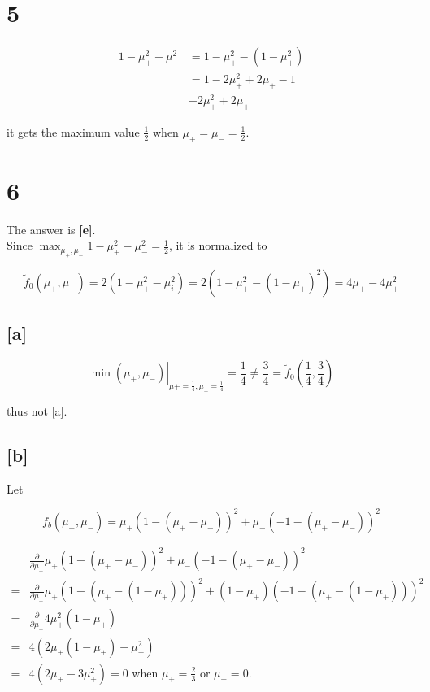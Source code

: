 \documentclass[fleqn,a4paper,12pt]{article}
\begin{document}
\section*{5}

\begin{align*}
  1 - \mu_+^2 - \mu_-^2
  &= 1 - \mu_+^2 - (1 - \mu_+^2) \\
  &= 1 - 2 \mu_+^2 + 2 \mu_+  - 1 \\
  & -2 \mu_+^2 + 2 \mu_+
\end{align*}

it gets the maximum value $\frac{1}{2}$ when $\mu_+ = \mu_- = \frac{1}{2}$.

\section*{6}

The answer is \textbf{[e]}.\\

Since $\max_{\mu_+, \mu_-} 1 - \mu_+^2 - \mu_-^2 = \frac{1}{2}$, it is normalized to

\begin{equation*}
  \tilde{f}_0(\mu_+, \mu_-) = 2(1 - \mu_+^2 - \mu_i^2) = 2(1 - \mu_+^2 - (1 - \mu_+)^2) = 4 \mu_+ - 4 \mu_+^2 
\end{equation*}

\subsection*{[a]}

\begin{equation*}
  \left. \min(\mu_+, \mu_-) \right|_{\mu+=\frac{1}{4}, \mu_-=\frac{1}{4}} = \frac{1}{4} \ne \frac{3}{4} = \tilde{f}_0(\frac{1}{4}, \frac{3}{4})
\end{equation*}

thus not [a].

\subsection*{[b]}

Let

\begin{equation*}
  f_b(\mu_+, \mu_-) = \mu_+(1 - (\mu_+ - \mu_-))^2 + \mu_-(-1 - (\mu_+ - \mu_-))^2
\end{equation*}

\begin{align*}
  &  \frac{\partial}{\partial \mu_+} \mu_+(1 - (\mu_+ - \mu_-))^2 + \mu_-(-1 - (\mu_+ - \mu_-))^2 \\
  =& \frac{\partial}{\partial \mu_+} \mu_+(1 - (\mu_+ - (1 - \mu_+)))^2 + (1 - \mu_+)(-1 - (\mu_+ - (1 - \mu_+)))^2 \\
  =& \frac{\partial}{\partial \mu_+}  4 \mu_+^2 (1 - \mu_+) \\  
  =& 4 (2\mu_+(1 - \mu_+) - \mu_+^2 ) \\
  =& 4 (2\mu_+ - 3 \mu_+^2 ) = 0 \text{ when $\mu_+ = \frac{2}{3}$ or  $\mu_+ = 0$.}
\end{align*}
\end{document}
